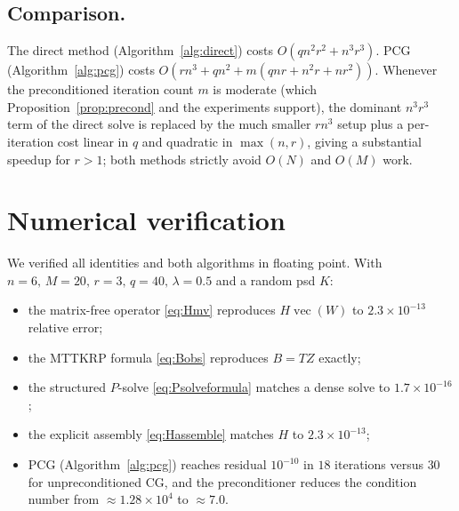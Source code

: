 \documentclass[12pt]{article}
\DeclareMathOperator{\vecop}{vec}
\theoremstyle{definition}
\begin{document}
\subsection{Comparison.}
The direct method (Algorithm~\ref{alg:direct}) costs $O(qn^2r^2+n^3r^3)$. PCG
(Algorithm~\ref{alg:pcg}) costs $O(rn^3+qn^2+m(qnr+n^2r+nr^2))$. Whenever the
preconditioned iteration count $m$ is moderate (which Proposition~\ref{prop:precond}
and the experiments support), the dominant $n^3r^3$ term of the direct solve is
replaced by the much smaller $rn^3$ setup plus a per-iteration cost linear in $q$
and quadratic in $\max(n,r)$, giving a substantial speedup for $r>1$; both methods
strictly avoid $O(N)$ and $O(M)$ work.

\section{Numerical verification}\label{sec:numerics}

We verified all identities and both algorithms in floating point. With
$n=6,\,M=20,\,r=3,\,q=40,\,\lambda=0.5$ and a random psd $K$:
\begin{itemize}[nosep]
\item the matrix-free operator \eqref{eq:Hmv} reproduces $H\vecop(W)$ to
$2.3\times10^{-13}$ relative error;
\item the MTTKRP formula \eqref{eq:Bobs} reproduces $B=TZ$ exactly;
\item the structured $P$-solve \eqref{eq:Psolveformula} matches a dense solve to
$1.7\times10^{-16}$;
\item the explicit assembly \eqref{eq:Hassemble} matches $H$ to $2.3\times10^{-13}$;
\item PCG (Algorithm~\ref{alg:pcg}) reaches residual $10^{-10}$ in $18$ iterations
versus $30$ for unpreconditioned CG, and the preconditioner reduces the condition
number from $\approx1.28\times10^{4}$ to $\approx7.0$.
\end{itemize}
\end{document}
